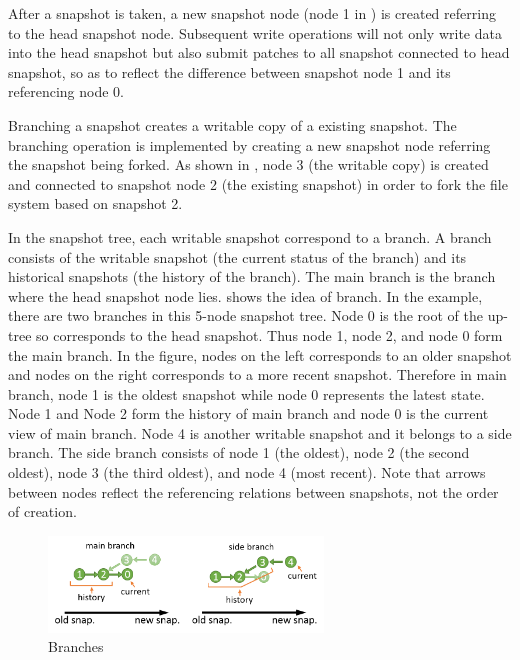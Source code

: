     After a snapshot is taken, a new snapshot node (node 1 in ) is created referring to the head snapshot node. Subsequent write operations will not only write data into the head snapshot but also submit patches to all snapshot connected to head snapshot, so as to reflect the difference between snapshot node 1 and its referencing node 0.

    Branching a snapshot creates a writable copy of a existing snapshot. The branching operation is implemented by creating a new snapshot node referring the snapshot being forked. As shown in , node 3 (the writable copy) is created and connected to snapshot node 2 (the existing snapshot) in order to fork the file system based on snapshot 2.

    In the snapshot tree, each writable snapshot correspond to a branch. A branch consists of the writable snapshot (the current status of the branch) and its historical snapshots (the history of the branch). The main branch is the branch where the head snapshot node lies.  shows the idea of branch. In the example, there are two branches in this 5-node snapshot tree. Node 0 is the root of the up-tree so corresponds to the head snapshot. Thus node 1, node 2, and node 0 form the main branch. In the figure, nodes on the left corresponds to an older snapshot and nodes on the right corresponds to a more recent snapshot. Therefore in main branch, node 1 is the oldest snapshot while node 0 represents the latest state. Node 1 and Node 2 form the history of main branch and node 0 is the current view of main branch. Node 4 is another writable snapshot and it belongs to a side branch. The side branch consists of node 1 (the oldest), node 2 (the second oldest), node 3 (the third oldest), and node 4 (most recent). Note that arrows between nodes reflect the referencing relations between snapshots, not the order of creation.

\begin{figure}[t]
\centering
\includegraphics[width=0.65\textwidth]{Chapter-4/figs/fig22.png}
\caption{Branches}
\label{fig:branches}
\end{figure}

